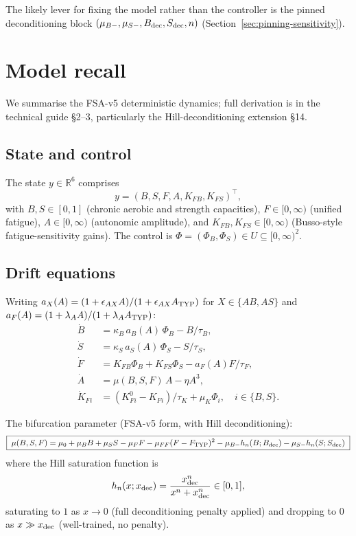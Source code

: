 \documentclass[11pt,a4paper]{article}
\theoremstyle{definition}
\newcommand{\R}{\mathbb{R}}
\begin{document}
The likely lever for fixing the model rather than the controller is the pinned deconditioning block $(\mu_{B-}, \mu_{S-}, B_{\rm dec}, S_{\rm dec}, n)$ (Section~\ref{sec:pinning-sensitivity}).

\section{Model recall} \label{sec:model-recall}

We summarise the FSA-v5 deterministic dynamics; full derivation is in the technical guide \cite{tech-guide-v5} \S{}2--3, particularly the Hill-deconditioning extension \S{}14.

\subsection{State and control}

The state $y \in \R^6$ comprises
\[
y = (B, S, F, A, K_{FB}, K_{FS})^\top,
\]
with $B, S \in [0,1]$ (chronic aerobic and strength capacities), $F \in [0,\infty)$ (unified fatigue), $A \in [0,\infty)$ (autonomic amplitude), and $K_{FB}, K_{FS} \in [0,\infty)$ (Busso-style fatigue-sensitivity gains). The control is $\Phi = (\Phi_B, \Phi_S) \in U \subseteq [0,\infty)^2$.

\subsection{Drift equations}

Writing $a_X(A) = (1 + \epsilon_{AX} A)/(1 + \epsilon_{AX} A_{\rm TYP})$ for $X \in \{AB, AS\}$ and $a_F(A) = (1 + \lambda_A A)/(1 + \lambda_A A_{\rm TYP})$:
\begin{align}
\dot B   &= \kappa_B \, a_B(A) \, \Phi_B - B/\tau_B, \label{eq:drift-B}\\
\dot S   &= \kappa_S \, a_S(A) \, \Phi_S - S/\tau_S, \label{eq:drift-S}\\
\dot F   &= K_{FB}\Phi_B + K_{FS}\Phi_S - a_F(A) F/\tau_F, \label{eq:drift-F}\\
\dot A   &= \mu(B,S,F)\,A - \eta A^3, \label{eq:drift-A}\\
\dot K_{Fi} &= (K_{Fi}^0 - K_{Fi})/\tau_K + \mu_K \Phi_i, \quad i \in \{B,S\}. \label{eq:drift-K}
\end{align}

The bifurcation parameter (FSA-v5 form, with Hill deconditioning):
\begin{equation}
\boxed{\;
\mu(B, S, F) = \mu_0 + \mu_B B + \mu_S S - \mu_F F - \mu_{FF}(F - F_{\rm TYP})^2 - \mu_{B-} h_n(B; B_{\rm dec}) - \mu_{S-} h_n(S; S_{\rm dec})
\;}
\label{eq:mu}
\end{equation}
where the Hill saturation function is
\begin{equation}
h_n(x; x_{\rm dec}) = \frac{x_{\rm dec}^n}{x^n + x_{\rm dec}^n} \in [0, 1],
\label{eq:hill}
\end{equation}
saturating to $1$ as $x \to 0$ (full deconditioning penalty applied) and dropping to $0$ as $x \gg x_{\rm dec}$ (well-trained, no penalty).
\end{document}
